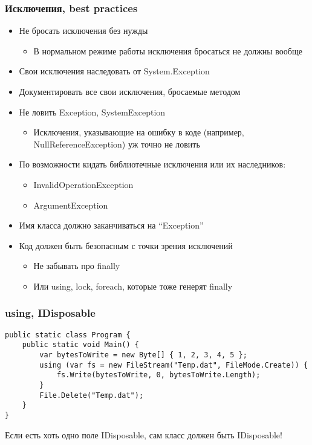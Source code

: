 \documentclass{../../slides-style}
\begin{document}
    \begin{frame}
        \frametitle{Исключения, best practices}
        \begin{itemize}
            \item Не бросать исключения без нужды
            \begin{itemize}
                \item В нормальном режиме работы исключения бросаться не должны вообще
            \end{itemize}
            \item Свои исключения наследовать от System.Exception
            \item Документировать все свои исключения, бросаемые методом
            \item Не ловить Exception, SystemException
            \begin{itemize}
                \item Исключения, указывающие на ошибку в коде (например, NullReferenceException) уж точно не ловить
            \end{itemize}
            \item По возможности кидать библиотечные исключения или их наследников:
            \begin{itemize}
                \item InvalidOperationException
                \item ArgumentException
            \end{itemize}
            \item Имя класса должно заканчиваться на ``Exception''
            \item Код должен быть безопасным с точки зрения исключений
            \begin{itemize}
                \item Не забывать про finally 
                \item Или using, lock, foreach, которые тоже генерят finally
            \end{itemize}
        \end{itemize}
    \end{frame}

    \begin{frame}[fragile]
        \frametitle{using, IDisposable}
        \begin{small}
            \begin{verbatim}
public static class Program {
    public static void Main() {
        var bytesToWrite = new Byte[] { 1, 2, 3, 4, 5 };
        using (var fs = new FileStream("Temp.dat", FileMode.Create)) {
            fs.Write(bytesToWrite, 0, bytesToWrite.Length);
        }
        File.Delete("Temp.dat");
    }
}
            \end{verbatim}
        \end{small}
        Если есть хоть одно поле IDisposable, сам класс должен быть IDisposable!
    \end{frame}
\end{document}
